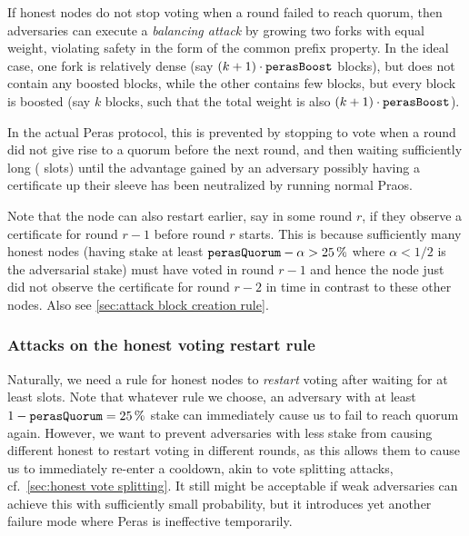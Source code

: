 If honest nodes do not stop voting when a round failed to reach quorum, then adversaries can execute a \emph{balancing attack} by growing two forks with equal weight, violating safety in the form of the common prefix property.
In the ideal case, one fork is relatively dense (say $(k+1) \cdot \mathtt{perasBoost}$ blocks), but does not contain any boosted blocks, while the other contains few blocks, but every block is boosted (say $k$ blocks, such that the total weight is also $(k+1)\cdot\mathtt{perasBoost}$).

\medskip
In the actual Peras protocol, this is prevented by stopping to vote when a round did not give rise to a quorum before the next round, and then waiting sufficiently long (\Theal{} slots) until the advantage gained by an adversary possibly having a certificate up their sleeve has been neutralized by running normal Praos.

Note that the node can also restart earlier, say in some round $r$, if they observe a certificate for round $r-1$ before round $r$ starts.
This is because sufficiently many honest nodes (having stake at least $\mathtt{perasQuorum} - \alpha > \qty{25}{\percent}$ where $\alpha<1/2$ is the adversarial stake) must have voted in round $r-1$ and hence the node just did not observe the certificate for round $r-2$ in time in contrast to these other nodes.
Also see \cref{sec:attack block creation rule}.

\subsubsection{Attacks on the honest voting restart rule}

Naturally, we need a rule for honest nodes to \emph{restart} voting after waiting for at least \Theal{} slots.
Note that whatever rule we choose, an adversary with at least $1-\mathtt{perasQuorum} = \qty{25}{\percent}$ stake can immediately cause us to fail to reach quorum again.
However, we want to prevent adversaries with less stake from causing different honest to restart voting in different rounds, as this allows them to cause us to immediately re-enter a cooldown, akin to vote splitting attacks, cf.~\cref{sec:honest vote splitting}.
It still might be acceptable if weak adversaries can achieve this with sufficiently small probability, but it introduces yet another failure mode where Peras is ineffective temporarily.


